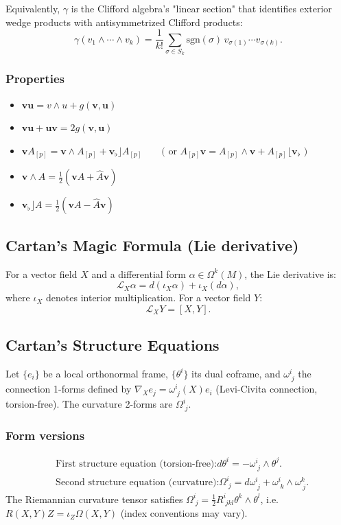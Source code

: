 \documentclass[12pt]{article}
\begin{document}
Equivalently, \(\gamma\) is the Clifford algebra's "linear section" that identifies exterior wedge products with antisymmetrized Clifford products:
\[
\gamma(v_1 \wedge \cdots \wedge v_k) = \frac{1}{k!} \sum_{\sigma \in S_k} \mathrm{sgn}(\sigma) \, v_{\sigma(1)} \cdots v_{\sigma(k)}.
\]

\subsubsection{Properties}
\begin{itemize}
	\item $ \bm{vu} = v \wedge u + g(\bm{v}, \bm{u})$
	\item $\bm{vu} + \bm{uv} = 2g(\bm{v}, \bm{u})$
	\item $ \bm{v}A_{[p]} = \bm{v}\wedge A_{[p]} + \bm{v}_\flat \rfloor A_{[p]} \qquad \text{( or } A_{[p]}\bm{v} = A_{[p]} \wedge \bm{v} +  A_{[p]} \lfloor \bm{v}_\flat \text{ )} $
	\item $\bm{v} \wedge A = \frac{1}{2} (\bm{v}A + \hat{A}\bm{v})$
	\item $\bm{v}_\flat \rfloor A = \frac{1}{2}(\bm{v}A - \hat{A}\bm{v}) $
\end{itemize}


\newpage

\subsection*{Cartan's Magic Formula (Lie derivative)}
For a vector field \(X\) and a differential form \(\alpha \in \Omega^k(M)\), the Lie derivative is:
\[
\mathcal{L}_X \alpha = d(\iota_X \alpha) + \iota_X(d\alpha),
\]
where \(\iota_X\) denotes interior multiplication. For a vector field \(Y\):
\[
\mathcal{L}_X Y = [X, Y].
\]

\subsection*{Cartan's Structure Equations}
Let \(\{e_i\}\) be a local orthonormal frame, \(\{\theta^i\}\) its dual coframe, and \(\omega^i_{\;j}\) the connection 1-forms defined by \(\nabla_X e_j = \omega^i_{\;j}(X) e_i\) (Levi-Civita connection, torsion-free). The curvature 2-forms are \(\Omega^i_{\;j}\).

\subsubsection*{Form versions}
\begin{align}
	&\text{First structure equation (torsion-free):} 
	d\theta^i = -\omega^i_{\;j} \wedge \theta^j. \label{eq:first_form} \\
	&\text{Second structure equation (curvature):} 
	\Omega^i_{\;j} = d\omega^i_{\;j} + \omega^i_{\;k} \wedge \omega^k_{\;j}. \label{eq:second_form}
\end{align}
The Riemannian curvature tensor satisfies \(\Omega^i_{\;j} = \frac{1}{2} R^i_{\;jkl} \theta^k \wedge \theta^l\), i.e. \(R(X,Y)Z = \iota_Z \Omega(X,Y)\) (index conventions may vary).
\end{document}
